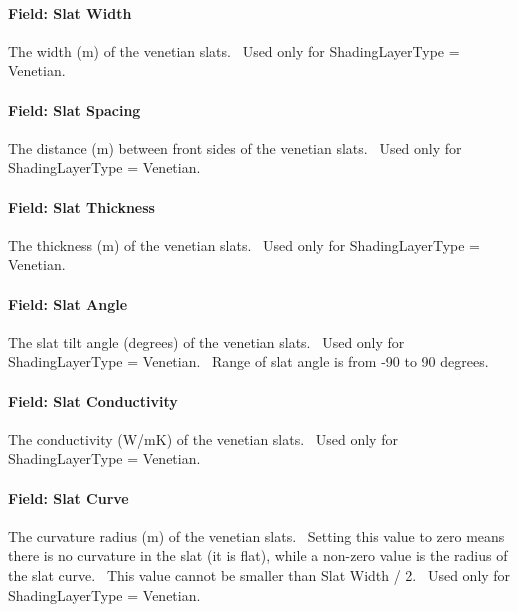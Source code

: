 \paragraph{Field: Slat Width}\label{field-slat-width-1}

The width (m) of the venetian slats.~ Used only for ShadingLayerType = Venetian.

\paragraph{Field: Slat Spacing}\label{field-slat-spacing}

The distance (m) between front sides of the venetian slats.~ Used only for ShadingLayerType = Venetian.

\paragraph{Field: Slat Thickness}\label{field-slat-thickness-1}

The thickness (m) of the venetian slats.~ Used only for ShadingLayerType = Venetian.

\paragraph{Field: Slat Angle}\label{field-slat-angle-1}

The slat tilt angle (degrees) of the venetian slats.~ Used only for ShadingLayerType = Venetian.~ Range of slat angle is from -90 to 90 degrees.

\paragraph{Field: Slat Conductivity}\label{field-slat-conductivity-1}

The conductivity (W/mK) of the venetian slats.~ Used only for ShadingLayerType = Venetian.

\paragraph{Field: Slat Curve}\label{field-slat-curve}

The curvature radius (m) of the venetian slats.~ Setting this value to zero means there is no curvature in the slat (it is flat), while a non-zero value is the radius of the slat curve.~ This value cannot be smaller than Slat Width / 2.~ Used only for ShadingLayerType = Venetian.

